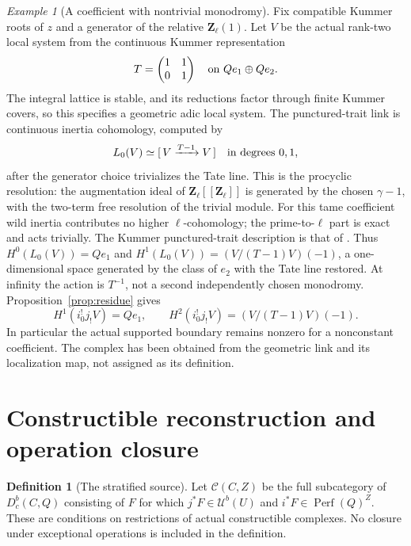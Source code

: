 \documentclass[11pt]{article}
\theoremstyle{definition}
\newtheorem{definition}[theorem]{Definition}
\theoremstyle{remark}
\newtheorem{example}[theorem]{Example}
\newcommand{\Perf}{\operatorname{Perf}}
\begin{document}
\begin{example}[A coefficient with nontrivial monodromy]
\label{ex:jordan}
Fix compatible Kummer roots of $z$ and a generator of the relative
$\mathbf Z_\ell(1)$.  Let $V$ be the actual rank-two local system from
the continuous Kummer representation
\[
 T=\begin{pmatrix}1&1\\0&1\end{pmatrix}
 \quad\hbox{on }Qe_1\oplus Qe_2.
\]
The integral lattice is stable, and its reductions factor through finite
Kummer covers, so this specifies a geometric adic local system.  The
punctured-trait link is continuous inertia cohomology, computed by
\[
 L_0(V)\simeq [\,V\xrightarrow{T-1}V\,]
 \quad\hbox{in degrees }0,1,
\]
after the generator choice trivializes the Tate line.  This is the
procyclic resolution: the augmentation ideal of
$\mathbf Z_\ell[[\mathbf Z_\ell]]$ is generated by the chosen
$\gamma-1$, with the two-term free resolution of the trivial module.
For this tame coefficient wild inertia contributes no higher
$\ell$-cohomology; the prime-to-$\ell$ part is exact and acts trivially.
The Kummer punctured-trait description is that of
\cite[\S4.7]{IllusieOverview}.
Thus $H^0(L_0(V))=Qe_1$ and
$H^1(L_0(V))=(V/(T-1)V)(-1)$, a one-dimensional space generated by the
class of $e_2$ with the Tate line restored.  At infinity the action is
$T^{-1}$, not a second independently chosen monodromy.
Proposition~\ref{prop:residue} gives
\[
 H^1(i_0^!j_!V)=Qe_1,\qquad
 H^2(i_0^!j_!V)=(V/(T-1)V)(-1).
\]
In particular the actual supported boundary remains nonzero for a
nonconstant coefficient.  The complex has been obtained from the
geometric link and its localization map, not assigned as its definition.
\end{example}

\section{Constructible reconstruction and operation closure}
\begin{definition}[The stratified source]
Let $\mathcal C(C,Z)$ be the full subcategory of $D_c^b(C,Q)$ consisting
of $F$ for which $j^*F\in\mathcal U^b(U)$ and
$i^*F\in\Perf(Q)^Z$.  These are conditions on restrictions of actual
constructible complexes.  No closure under exceptional operations is
included in the definition.
\end{definition}
\end{document}
